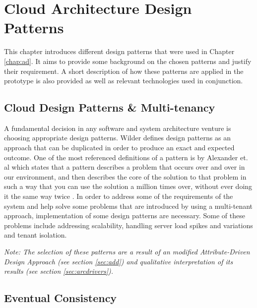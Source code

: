 \chapter{Cloud Architecture Design Patterns}

This chapter introduces different design patterns that were used in Chapter \ref{chap:ad}. It aims to provide some background on the chosen patterns and justify their requirement. A short description of how these patterns are applied in the prototype  is also provided as well as relevant technologies used in conjunction.

\section{Cloud Design Patterns \& Multi-tenancy}

A fundamental decision in any software and system architecture venture is choosing appropriate design patterns. Wilder \cite{Wilder2012-so} defines design patterns as an approach that can be duplicated in order to produce an exact and expected outcome. One of the most referenced definitions of a pattern is by Alexander et. al which states that a pattern describes a problem that occurs over and over in our environment, and then describes the core of the solution to that problem in such a way that you can use the solution a million times over, without ever doing it the same way twice \cite{Alexander1977-ni}. In order to address some of the requirements of the system and help solve some problems that are introduced by using a multi-tenant approach, implementation of some design patterns are necessary. Some of these problems include addressing scalability, handling server load spikes and variations and tenant isolation. 

\textit{Note: The selection of these patterns are a result of an modified Attribute-Driven Design Approach (see section \ref{sec:add}) and qualitative interpretation of its results (see section \ref{sec:arcdrivers}).}

\section{Eventual Consistency}

